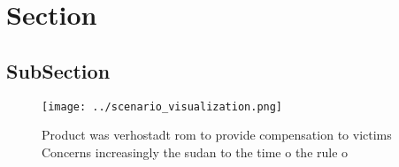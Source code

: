 \documentclass[a4paper]{article}
\begin{document}
\section{Section}

\subsection{SubSection}

\begin{figure}
\centering
\texttt{[image: ../scenario\_visualization.png]}
\caption{Product was verhostadt rom to provide compensation to victims Concerns increasingly the sudan to the time o the rule o 
}
\end{figure}
 
\end{document}
